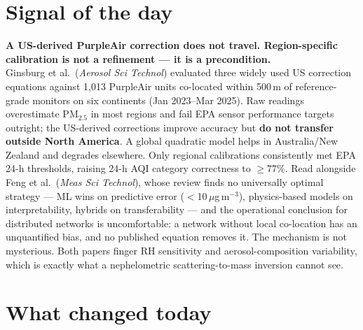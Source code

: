 \documentclass[10pt]{article}
\begin{document}
\vspace{6mm}

\section*{\sffamily\bfseries\color{Deep}Signal of the day}
\vspace{-1.5mm}{\color{Amber}\rule{\linewidth}{1.1pt}}\vspace{2.5mm}

\begin{keybox}
{\sffamily\bfseries\small\color{Deep}A US-derived PurpleAir correction does not travel.
Region-specific calibration is not a refinement --- it is a precondition.}\\[1.4mm]
\footnotesize
Ginsburg et al.\ (\textit{Aerosol Sci Technol}) evaluated three widely used US correction
equations against 1{,}013 PurpleAir units co-located within 500\,m of reference-grade
monitors on six continents (Jan 2023--Mar 2025). Raw readings overestimate PM$_{2.5}$ in
most regions and fail EPA sensor performance targets outright; the US-derived corrections
improve accuracy but \textbf{do not transfer outside North America}. A global quadratic
model helps in Australia/New Zealand and degrades elsewhere. Only regional calibrations
consistently met EPA 24-h thresholds, raising 24-h AQI category correctness to
$\geq$77\%. Read alongside Feng et al.\ (\textit{Meas Sci Technol}), whose review finds
no universally optimal strategy --- ML wins on predictive error
($<$10\,$\mu$g\,m$^{-3}$), physics-based models on interpretability, hybrids on
transferability --- and the operational conclusion for distributed networks is
uncomfortable: a network without local co-location has an unquantified bias, and no
published equation removes it. The mechanism is not mysterious. Both papers finger RH
sensitivity and aerosol-composition variability, which is exactly what a nephelometric
scattering-to-mass inversion cannot see.
\end{keybox}

\vspace{3mm}

\section*{\sffamily\bfseries\color{Deep}What changed today}
\vspace{-1.5mm}{\color{Amber}\rule{\linewidth}{1.1pt}}\vspace{2.5mm}
\end{document}
